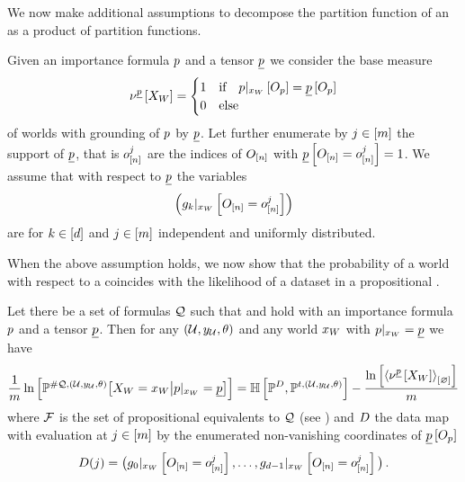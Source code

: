 We now make additional assumptions to decompose the partition function of an \HybridFOLNetwork{} as a product of \HybridLogicNetwork{} partition functions.

\begin{assumption}
    \label{ass:independentTuples}
    Given an importance formula $p$ and a tensor $\underline{p}$ we consider the base measure
    \begin{align*}
        \nu^{\underline{p}}\left[X_{W}\right]
        = \begin{cases}
              1 & \text{if}\quad {p}|_{x_{W}} \left[O_{p}\right] = \underline{p}\left[O_{p}\right] \\
              0 & \text{else}
        \end{cases}
    \end{align*}
    of worlds with grounding of $p$ by $\underline{p}$.
    Let further enumerate by $j\in[m]$ the support of $\underline{p}$, that is $o_{[n]}^j$ are the indices of $O_{[n]}$ with $\underline{p}\left[O_{[n]}=o_{[n]}^j\right]=1$.
    We assume that with respect to $\underline{p}$ the variables
    \begin{align}
        \left({g_{k}}|_{x_{W}} \left[O_{[n]}=o_{[n]}^j\right]\right)
    \end{align}
    are for $k\in[d]$ and $j\in[m]$ independent and uniformly distributed.
\end{assumption}

When the above assumption holds, we now show that the probability of a \firstOrderLogic{} world with respect to a \HybridFOLNetwork{} coincides with the likelihood of a dataset in a propositional \HybridLogicNetwork{}.

\begin{theorem}
    \label{the:FOLworldToPLdataset}
    Let there be a set of formulas $\mathcal{Q}$ such that  and  hold with an importance formula $p$ and a tensor $\underline{p}$.
    Then for any $(\mathcal{U},y_{\mathcal{U}},\theta)$ and any world $x_{W}$ with ${p}|_{x_{W}}=\underline{p}$ we have
    \begin{align*}
        \frac{1}{m} \ln \left[ \mathbb{P}^{\#\mathcal{Q},(\mathcal{U},y_{\mathcal{U}},\theta)}\big[X_{W}=x_{W}\big|{p}|_{x_{W}}=\underline{p}\big] \right]
        = \mathbb{H}\left[\mathbb{P}^{D},\mathbb{P}^{t,(\mathcal{U},y_{\mathcal{U}},\theta)}\right] -
        \frac{\ln \left[ \left\langle \nu^{\underline{p}}\left[X_{W}\right]\right\rangle_{\left[ \varnothing \right]} \right]}{m}
    \end{align*}
    where $\mathcal{F}$ is the set of propositional equivalents to $\mathcal{Q}$ (see ) and $D$ the data map with evaluation at $j\in[m]$ by the enumerated non-vanishing coordinates of $\underline{p}\left[O_{p}\right]$
    \begin{align*}
        D(j)
        = \big({g_{0}}|_{x_{W}} \left[O_{[n]}=o_{[n]}^j\right],\ldots,{g_{d-1}}|_{x_{W}} \left[O_{[n]}=o_{[n]}^j\right]\big) \, .
    \end{align*}
\end{theorem}

